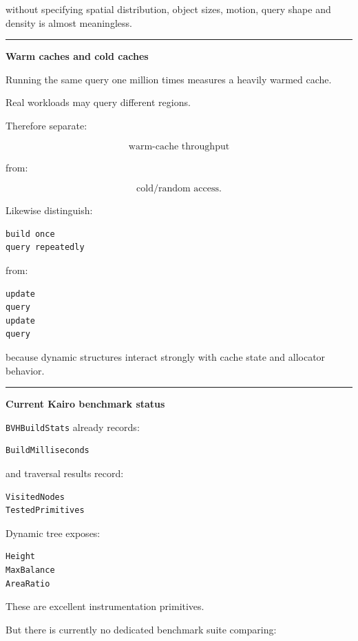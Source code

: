 without specifying spatial distribution, object sizes, motion, query shape and density is almost meaningless.

\begin{center}\rule{0.5\linewidth}{0.5pt}\end{center}

\textbf{Warm caches and cold caches}

Running the same query one million times measures a heavily warmed cache.

Real workloads may query different regions.

Therefore separate:

\[
\text{warm-cache throughput}
\]

from:

\[
\text{cold/random access}.
\]

Likewise distinguish:

\begin{verbatim}
build once
query repeatedly
\end{verbatim}

from:

\begin{verbatim}
update
query
update
query
\end{verbatim}

because dynamic structures interact strongly with cache state and allocator behavior.

\begin{center}\rule{0.5\linewidth}{0.5pt}\end{center}

\textbf{Current Kairo benchmark status}

\texttt{BVHBuildStats} already records:

\begin{verbatim}
BuildMilliseconds
\end{verbatim}

and traversal results record:

\begin{verbatim}
VisitedNodes
TestedPrimitives
\end{verbatim}

Dynamic tree exposes:

\begin{verbatim}
Height
MaxBalance
AreaRatio
\end{verbatim}

These are excellent instrumentation primitives.

But there is currently no dedicated benchmark suite comparing:


